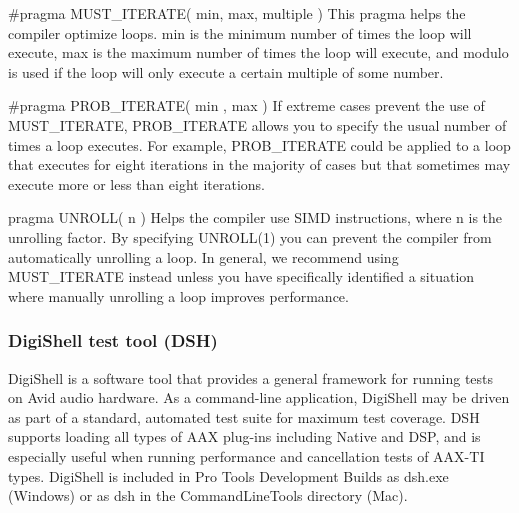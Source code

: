 \begin{DoxyItemize}
\item {\ttfamily \#pragma M\+U\+S\+T\+\_\+\+I\+T\+E\+R\+A\+T\+E( min, max, multiple )}  This pragma helps the compiler optimize loops. min is the minimum number of times the loop will execute, max is the maximum number of times the loop will execute, and modulo is used if the loop will only execute a certain multiple of some number. ~\newline
  
\item {\ttfamily \#pragma P\+R\+O\+B\+\_\+\+I\+T\+E\+R\+A\+T\+E( min , max )}  If extreme cases prevent the use of {\ttfamily M\+U\+S\+T\+\_\+\+I\+T\+E\+R\+A\+T\+E}, {\ttfamily P\+R\+O\+B\+\_\+\+I\+T\+E\+R\+A\+T\+E} allows you to specify the usual number of times a loop executes. For example, {\ttfamily P\+R\+O\+B\+\_\+\+I\+T\+E\+R\+A\+T\+E} could be applied to a loop that executes for eight iterations in the majority of cases but that sometimes may execute more or less than eight iterations. ~\newline
  
\item {\ttfamily pragma U\+N\+R\+O\+L\+L( n )}  Helps the compiler use S\+I\+M\+D instructions, where {\ttfamily n} is the unrolling factor. By specifying {\ttfamily U\+N\+R\+O\+L\+L(1)} you can prevent the compiler from automatically unrolling a loop. In general, we recommend using {\ttfamily M\+U\+S\+T\+\_\+\+I\+T\+E\+R\+A\+T\+E} instead unless you have specifically identified a situation where manually unrolling a loop improves performance.  
\end{DoxyItemize}

\hypertarget{a00362_subsection__digishell_test_tool}{}\subsubsection{Digi\+Shell test tool (\+D\+S\+H)}\label{a00362_subsection__digishell_test_tool}
 Digi\+Shell is a software tool that provides a general framework for running tests on Avid audio hardware. As a command-\/line application, Digi\+Shell may be driven as part of a standard, automated test suite for maximum test coverage. D\+S\+H supports loading all types of A\+A\+X plug-\/ins including Native and D\+S\+P, and is especially useful when running performance and cancellation tests of A\+A\+X-\/\+T\+I types. Digi\+Shell is included in Pro Tools Development Builds as {\ttfamily dsh.\+exe} (Windows) or as {\ttfamily dsh} in the {\ttfamily Command\+Line\+Tools} directory (Mac).

